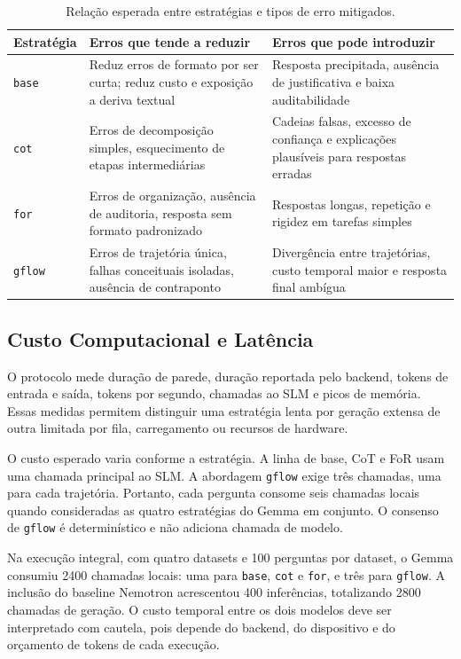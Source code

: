 \documentclass[12pt]{article}
\begin{document}
\begin{table}[ht]
\centering
\small
\caption{Relação esperada entre estratégias e tipos de erro mitigados.}
\label{tab:estrategia_erro}
\begin{tabular}{|p{2.7cm}|p{4.7cm}|p{4.7cm}|}
\hline
\textbf{Estratégia} & \textbf{Erros que tende a reduzir} & \textbf{Erros que pode introduzir} \\
\hline
\texttt{base} & Reduz erros de formato por ser curta; reduz custo e exposição a deriva textual & Resposta precipitada, ausência de justificativa e baixa auditabilidade \\
\hline
\texttt{cot} & Erros de decomposição simples, esquecimento de etapas intermediárias & Cadeias falsas, excesso de confiança e explicações plausíveis para respostas erradas \\
\hline
\texttt{for} & Erros de organização, ausência de auditoria, resposta sem formato padronizado & Respostas longas, repetição e rigidez em tarefas simples \\
\hline
\texttt{gflow} & Erros de trajetória única, falhas conceituais isoladas, ausência de contraponto & Divergência entre trajetórias, custo temporal maior e resposta final ambígua \\
\hline
\end{tabular}
\end{table}

\subsection{Custo Computacional e Latência}

O protocolo mede duração de parede, duração reportada pelo backend, tokens de entrada e saída, tokens por segundo, chamadas ao SLM e picos de memória. Essas medidas permitem distinguir uma estratégia lenta por geração extensa de outra limitada por fila, carregamento ou recursos de hardware.

O custo esperado varia conforme a estratégia. A linha de base, CoT e FoR usam uma chamada principal ao SLM. A abordagem \texttt{gflow} exige três chamadas, uma para cada trajetória. Portanto, cada pergunta consome seis chamadas locais quando consideradas as quatro estratégias do Gemma em conjunto. O consenso de \texttt{gflow} é determinístico e não adiciona chamada de modelo.

Na execução integral, com quatro datasets e 100 perguntas por dataset, o Gemma consumiu 2400 chamadas locais: uma para \texttt{base}, \texttt{cot} e \texttt{for}, e três para \texttt{gflow}. A inclusão do baseline Nemotron acrescentou 400 inferências, totalizando 2800 chamadas de geração. O custo temporal entre os dois modelos deve ser interpretado com cautela, pois depende do backend, do dispositivo e do orçamento de tokens de cada execução.
\end{document}
